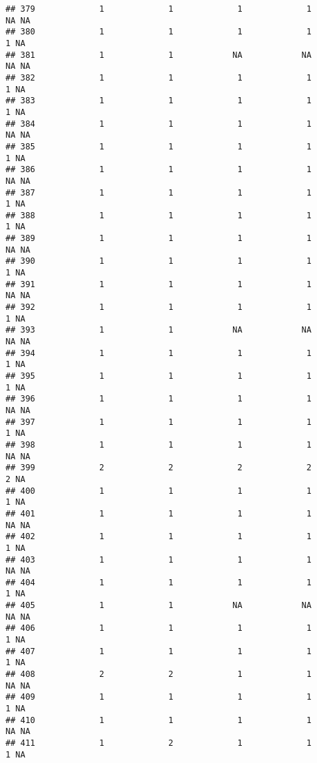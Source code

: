 \documentclass[
]{article}
\begin{document}
\begin{verbatim}
## 379             1             1             1             1            NA NA
## 380             1             1             1             1             1 NA
## 381             1             1            NA            NA            NA NA
## 382             1             1             1             1             1 NA
## 383             1             1             1             1             1 NA
## 384             1             1             1             1            NA NA
## 385             1             1             1             1             1 NA
## 386             1             1             1             1            NA NA
## 387             1             1             1             1             1 NA
## 388             1             1             1             1             1 NA
## 389             1             1             1             1            NA NA
## 390             1             1             1             1             1 NA
## 391             1             1             1             1            NA NA
## 392             1             1             1             1             1 NA
## 393             1             1            NA            NA            NA NA
## 394             1             1             1             1             1 NA
## 395             1             1             1             1             1 NA
## 396             1             1             1             1            NA NA
## 397             1             1             1             1             1 NA
## 398             1             1             1             1            NA NA
## 399             2             2             2             2             2 NA
## 400             1             1             1             1             1 NA
## 401             1             1             1             1            NA NA
## 402             1             1             1             1             1 NA
## 403             1             1             1             1            NA NA
## 404             1             1             1             1             1 NA
## 405             1             1            NA            NA            NA NA
## 406             1             1             1             1             1 NA
## 407             1             1             1             1             1 NA
## 408             2             2             1             1            NA NA
## 409             1             1             1             1             1 NA
## 410             1             1             1             1            NA NA
## 411             1             2             1             1             1 NA

\end{verbatim}
\end{document}

